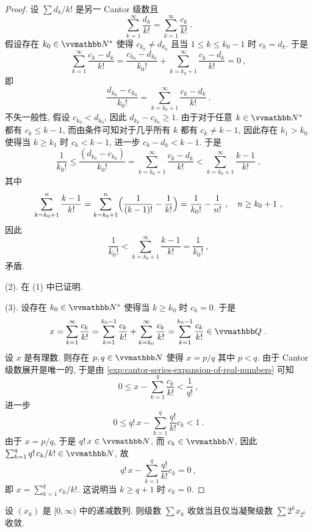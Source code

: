 \begin{proof}
    设 \(\sum d_k / k!\) 是另一 Cantor 级数且
    \[
        \sum_{k = 1}^\infty \frac{d_k}{k!} = \sum_{k = 1}^\infty \frac{c_k}{k!}\ .
    \]
    假设存在 \(k_0 \in \N^\ast\) 使得 \(c_{k_0} \neq d_{k_0}\) 且当 \(1 \leq k \leq k_0 - 1\) 时 \(c_k = d_k\). 于是
    \[
        \sum_{k = 1}^\infty \frac{c_k - d_k}{k!} = \frac{c_{k_0} - d_{k_0}}{k_0!} + \sum_{k = k_0 + 1}^\infty \frac{c_k - d_k}{k!} = 0\ ,
    \]
    即
    \[
        \frac{d_{k_0} - c_{k_0}}{k_0!} = \sum_{k = k_0 + 1}^\infty \frac{c_k - d_k}{k!}\ .
    \]
    不失一般性, 假设 \(c_{k_0} < d_{k_0}\), 因此 \(d_{k_0} - c_{k_0} \geq 1\). 由于对于任意 \(k \in \N^\ast\) 都有 \(c_k \leq k - 1\), 而由条件可知对于几乎所有 \(k\) 都有 \(c_k \neq k - 1\), 因此存在 \(k_1 > k_0\) 使得当 \(k \geq k_1\) 时 \(c_k < k - 1\), 进一步 \(c_k - d_k < k - 1\). 于是
    \[
        \frac{1}{k_0!} \leq \frac{(d_{k_0} - c_{k_0})}{k_0!} = \sum_{k = k_0 + 1}^\infty \frac{c_k - d_k}{k!} < \sum_{k = k_0 + 1}^\infty \frac{k - 1}{k!}\ ,
    \]
    其中
    \[
        \sum_{k = k_0 + 1}^n \frac{k - 1}{k!} = \sum_{k = k_0 + 1}^n \Bigl(\frac{1}{(k - 1)!} - \frac{1}{k!}\Bigr) = \frac{1}{k_0!} - \frac{1}{n!}\ ,\quad n \geq k_0 + 1\ ,
    \]
    因此
    \[
        \frac{1}{k_0!} < \sum_{k = k_0 + 1}^\infty \frac{k - 1}{k!} = \frac{1}{k_0!}\ ,
    \]
    矛盾.

    (2). 在 (1) 中已证明.

    (3). 设存在 \(k_0 \in \N^\ast\) 使得当 \(k \geq k_0\) 时 \(c_k = 0\). 于是
    \[
        x = \sum_{k = 1}^\infty \frac{c_k}{k!} = \sum_{k = 1}^{k_0 - 1}\frac{c_k}{k!} + \sum_{k = k_0}^\infty \frac{c_k}{k!} = \sum_{k = 1}^{k_0 - 1}\frac{c_k}{k!} \in \Q\ .
    \]
    设 \(x\) 是有理数. 则存在 \(p, q \in \N\) 使得 \(x = p / q\) 其中 \(p < q\). 由于 Cantor 级数展开是唯一的, 于是由 \eqref{exp:cantor-series-expansion-of-real-numbers} 可知
    \[
        0 \leq x - \sum_{k = 1}^q \frac{c_k}{k!} < \frac{1}{q!}\ ,
    \]
    进一步
    \[
        0 \leq q!\, x - \sum_{k = 1}^q \frac{q!}{k!} c_k < 1\ .
    \]
    由于 \(x = p / q\), 于是 \(q!\, x \in \N\), 而 \(c_k \in \N\), 因此 \(\sum_{k = 1}^q q!\, c_k / k! \in \N\), 故
    \[
        q!\, x - \sum_{k = 1}^q \frac{q!}{k!} c_k = 0\ ,
    \]
    即 \(x = \sum_{k = 1}^q c_k / k!\). 这说明当 \(k \geq q + 1\) 时 \(c_k = 0\).
\end{proof}

\begin{exercise}\label{ex:cauchy-condensation-theorem}
    设 \((x_k)\) 是 \([0, \infty)\) 中的递减数列. 则级数 \(\sum x_k\) 收敛当且仅当凝聚级数 \(\sum 2^k x_{2^k}\) 收敛.
\end{exercise}

